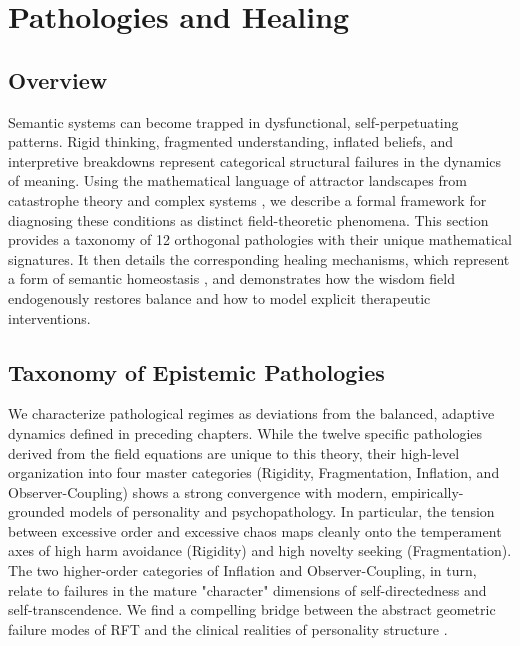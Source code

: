 \chapter{Pathologies and Healing}
\label{16:pathologies_and_healing}


\section{Overview}

Semantic systems can become trapped in dysfunctional, self-perpetuating patterns. Rigid thinking, fragmented understanding, inflated beliefs, and interpretive breakdowns represent categorical structural failures in the dynamics of meaning. Using the mathematical language of attractor landscapes from catastrophe theory and complex systems \autocite{Thom1975, Zeeman1977, Milnor1985}, we describe a formal framework for diagnosing these conditions as distinct field-theoretic phenomena. This section provides a taxonomy of 12 orthogonal pathologies with their unique mathematical signatures. It then details the corresponding healing mechanisms, which represent a form of semantic homeostasis \autocite{Cannon1932}, and demonstrates how the wisdom field endogenously restores balance and how to model explicit therapeutic interventions.


\section{Taxonomy of Epistemic Pathologies}
\label{16.1:taxonomy_of_epistemic_pathologies}

We characterize pathological regimes as deviations from the balanced, adaptive dynamics defined in preceding chapters. While the twelve specific pathologies derived from the field equations are unique to this theory, their high-level organization into four master categories (Rigidity, Fragmentation, Inflation, and Observer-Coupling) shows a strong convergence with modern, empirically-grounded models of personality and psychopathology. In particular, the tension between excessive order and excessive chaos maps cleanly onto the temperament axes of high harm avoidance (Rigidity) and high novelty seeking (Fragmentation). The two higher-order categories of Inflation and Observer-Coupling, in turn, relate to failures in the mature "character" dimensions of self-directedness and self-transcendence. We find a compelling bridge between the abstract geometric failure modes of RFT and the clinical realities of personality structure \autocite{Cloninger1993}.

